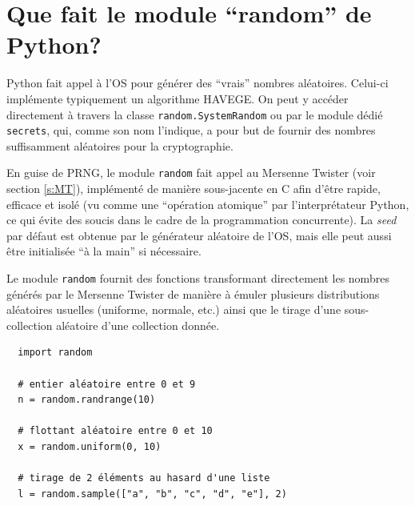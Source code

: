 \documentclass{scrartcl}
\begin{document}
\section{Que fait le module ``random'' de Python?}
Python fait appel à l'OS pour générer des ``vrais'' nombres aléatoires.
Celui-ci implémente typiquement un algorithme HAVEGE.
On peut y accéder directement à travers la classe \texttt{random.SystemRandom} ou par
le module dédié  \texttt{secrets}, qui, comme son nom l'indique, a pour but de
fournir des nombres suffisamment aléatoires pour la cryptographie.

En guise de PRNG, le module \texttt{random} fait appel au Mersenne Twister (voir
section \ref{s:MT}), implémenté de manière sous-jacente en C afin d'être rapide,
efficace et isolé (vu comme une ``opération atomique'' par l'interprétateur
Python, ce qui évite des soucis dans le cadre de la programmation concurrente).
La \textit{seed} par défaut est obtenue par le générateur aléatoire de l'OS,
mais elle peut aussi être initialisée ``à la main'' si nécessaire.

Le module \texttt{random} fournit des fonctions transformant directement les
nombres générés par le Mersenne Twister de manière à émuler plusieurs
distributions aléatoires usuelles (uniforme, normale, etc.) ainsi que le tirage
d'une sous-collection aléatoire d'une collection donnée.
\begin{lstlisting}
  import random

  # entier aléatoire entre 0 et 9
  n = random.randrange(10)

  # flottant aléatoire entre 0 et 10
  x = random.uniform(0, 10)

  # tirage de 2 éléments au hasard d'une liste
  l = random.sample(["a", "b", "c", "d", "e"], 2)
\end{lstlisting}
\end{document}
